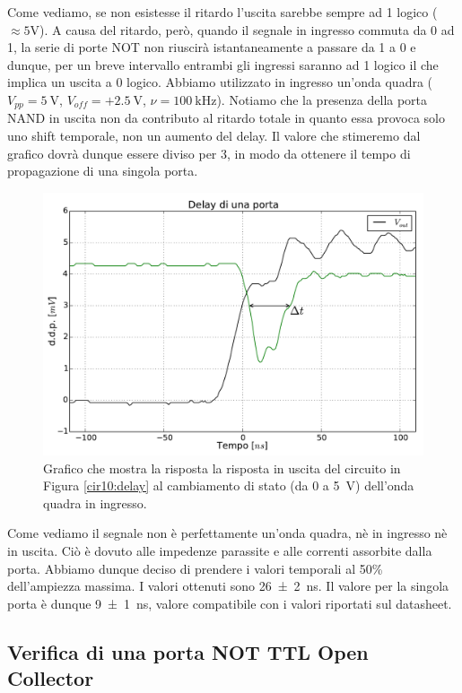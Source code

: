 Come vediamo, se non esistesse il ritardo l'uscita sarebbe sempre ad 1 logico ($\approx 5 \si{\volt}$).
A causa del ritardo, però, quando il segnale in ingresso commuta da 0 ad 1, la serie di porte NOT non riuscirà istantaneamente a passare da 1 a 0 e dunque, per un breve intervallo entrambi gli ingressi saranno ad 1 logico il che implica un uscita a 0 logico.
Abbiamo utilizzato in ingresso un'onda quadra ($V_{pp}=\SI{5}{\volt}$, $V_{off}=+\SI{2.5}{\volt}$, $\nu=\SI{100}{\kilo\hertz}$).
Notiamo che la presenza della porta NAND in uscita non da contributo al ritardo totale in quanto essa provoca solo uno shift temporale, non un aumento del delay.
Il valore che stimeremo dal grafico dovrà dunque essere diviso per 3, in modo da ottenere il tempo di propagazione di una singola porta.

\begin{figure}[htpc]
\centering
\includegraphics[width=.75\textwidth]{../E10/latex/gdelay.pdf}
\caption{Grafico che mostra la risposta la risposta in uscita del circuito in Figura \ref{cir10:delay} al cambiamento di stato (da 0 a \SI{5}{\V}) dell'onda quadra in ingresso.}
\label{gr10:delay}
\end{figure}

Come vediamo il segnale non è perfettamente un'onda quadra, nè in ingresso nè in uscita.
Ciò è dovuto alle impedenze parassite e alle correnti assorbite dalla porta.
Abbiamo dunque deciso di prendere i valori temporali al 50\% dell'ampiezza massima.
I valori ottenuti sono \SI{26\pm 2}{\nano\second}.
Il valore per la singola porta è dunque \SI{9\pm 1}{\nano\second}, valore compatibile con i valori riportati sul datasheet.

\newpage
\subsection{Verifica di una porta NOT TTL Open Collector }


